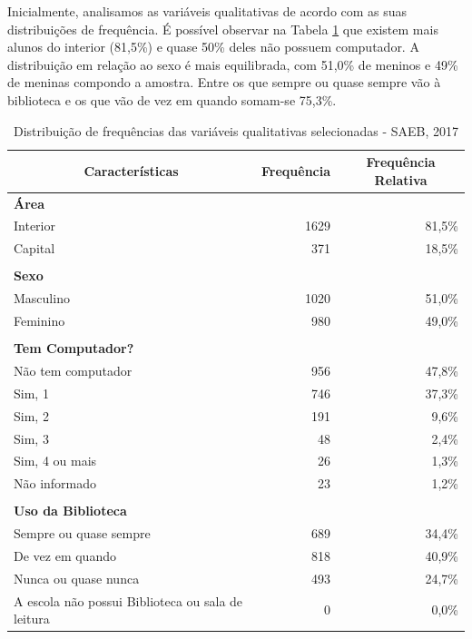 \documentclass[a4paper, 12pt]{article} %
\begin{document}
Inicialmente, analisamos as variáveis qualitativas de acordo com as suas distribuições de frequência. É possível observar na Tabela \ref{tab1} que existem mais alunos do interior (81,5\%) e quase 50\% deles não possuem computador. A distribuição em relação ao sexo é mais equilibrada, com 51,0\% de meninos e 49\% de meninas compondo a amostra. Entre os que sempre ou quase sempre vão à biblioteca e os que vão de vez em quando somam-se 75,3\%.

\begin{table}[!ht]
\caption{Distribuição de frequências das variáveis qualitativas selecionadas - SAEB, 2017}
\label{tab1}
\centering
\begin{tabular}{l|rr}
\hline
\multicolumn{1}{c|}{\textbf{Características}} & \multicolumn{1}{c}{\textbf{Frequência}} & \multicolumn{1}{c}{\textbf{Frequência Relativa}} \\ \hline
\textbf{Área} &  &  \\
Interior & 1629 & 81,5\% \\
Capital & 371 & 18,5\% \\
 &  &  \\
\textbf{Sexo} &  &  \\
Masculino & 1020 & 51,0\% \\
Feminino & 980 & 49,0\% \\
 &  &  \\
\textbf{Tem Computador?} &  &  \\
Não tem computador & 956 & 47,8\% \\
Sim, 1 & 746 & 37,3\% \\
Sim, 2 & 191 & 9,6\% \\
Sim, 3 & 48 & 2,4\% \\
Sim, 4 ou mais & 26 & 1,3\% \\
Não informado & 23 & 1,2\% \\
 &  &  \\
\textbf{Uso da Biblioteca} &  &  \\
Sempre ou quase sempre & 689 & 34,4\% \\
De vez em quando & 818 & 40,9\% \\
Nunca ou quase nunca & 493 & 24,7\% \\
A escola não possui Biblioteca ou sala de leitura & 0 & 0,0\% \\ \hline
\end{tabular}
\\ 
\end{table}
\end{document}

